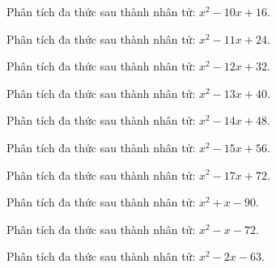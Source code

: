 \begin{bt}
	Phân tích đa thức sau thành nhân tử: $x^2 - 10 x + 16$.
\end{bt}
\begin{bt}
	Phân tích đa thức sau thành nhân tử: $x^2 - 11 x + 24$.
\end{bt}
\begin{bt}
	Phân tích đa thức sau thành nhân tử: $x^2 - 12 x + 32$.
\end{bt}
\begin{bt}
	Phân tích đa thức sau thành nhân tử: $x^2 - 13 x + 40$.
\end{bt}
\begin{bt}
	Phân tích đa thức sau thành nhân tử: $x^2 - 14 x + 48$.
\end{bt}
\begin{bt}
	Phân tích đa thức sau thành nhân tử: $x^2 - 15 x + 56$.
\end{bt}
\begin{bt}
	Phân tích đa thức sau thành nhân tử: $x^2 - 17 x + 72$.
\end{bt}
\begin{bt}
	Phân tích đa thức sau thành nhân tử: $x^2 + x - 90$.
\end{bt}
\begin{bt}
	Phân tích đa thức sau thành nhân tử: $x^2 - x - 72$.
\end{bt}
\begin{bt}
	Phân tích đa thức sau thành nhân tử: $x^2 - 2 x - 63$.
\end{bt}
